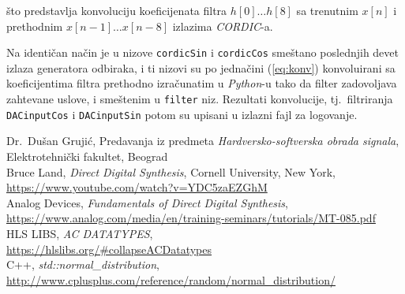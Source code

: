 \documentclass[conference]{IEEEtran}
\begin{document}
\noindent što predstavlja konvoluciju koeficijenata filtra $h[0]\ldots h[8]$ sa trenutnim $x[n]$ i prethodnim $x[n-1]\ldots x[n-8]$ izlazima \textit{CORDIC}-a.

Na identičan način je u nizove \texttt{cordicSin} i \texttt{cordicCos} smeštano poslednjih devet izlaza generatora odbiraka, i ti nizovi su po jednačini (\ref{eq:konv}) konvoluirani sa koeficijentima filtra prethodno izračunatim u \textit{Python}-u tako da filter zadovoljava zahtevane uslove, i smeštenim u \texttt{filter} niz. Rezultati konvolucije, tj.~filtriranja \texttt{DACinputCos} i \texttt{DACinputSin} potom su upisani u izlazni fajl za logovanje.

\newpage

\begin{thebibliography}{00}
	 Dr.~Dušan Grujić, Predavanja iz predmeta \textsl{Hardversko-softverska obrada signala}, Elektrotehnički fakultet, Beograd\\
	 Bruce Land, \textsl{Direct Digital Synthesis}, Cornell University, New York, \\\url{https://www.youtube.com/watch?v=YDC5zaEZGhM}\\
	 Analog Devices, \textsl{Fundamentals of Direct Digital Synthesis}, \\\url{https://www.analog.com/media/en/training-seminars/tutorials/MT-085.pdf}\\
	 HLS LIBS, \textsl{AC DATATYPES}, \\\url{https://hlslibs.org/#collapseACDatatypes}\\
	 C++, \textsl{std::normal\_distribution}, \\\url{http://www.cplusplus.com/reference/random/normal_distribution/}\\
\end{thebibliography}
\end{document}
